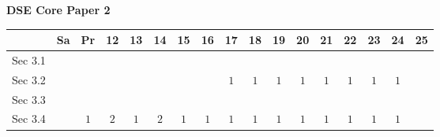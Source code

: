 \documentclass[12pt, a4paper]{article}
\begin{document}
\begin{absolutelynopagebreak}
\begin{center}
\textbf{DSE Core Paper 2}
\end{center}
\begin{center}
\begin{tabular}{|l|c|c|c|c|c|c|c|c|c|c|c|c|c|c|c|c|}
\hline
        & Sa & Pr & 12 & 13 & 14 & 15 & 16 & 17 & 18 & 19 & 20 & 21 & 22 & 23 & 24 & 25 \\\hline\hline
Sec 3.1 &  &  &  &  &  &  &  &  &  &  &  &  &  &  &  &  \\\hline
Sec 3.2 &  &  &  &  &  &  &  &  $1$ &  $1$ &  $1$ &  $1$ &  $1$ &  $1$ &  $1$ &  $1$ &  \\\hline
Sec 3.3 &  &  &  &  &  &  &  &  &  &  &  &  &  &  &  &  \\\hline
Sec 3.4 &  &  $1$ &  $2$ &  $1$ &  $2$ &  $1$ &  $1$ &  $1$ &  $1$ &  $1$ &  $1$ &  $1$ &  $1$ &  $1$ &  $1$ &  \\\hline
\end{tabular}
\end{center}
\end{absolutelynopagebreak}
\end{document}
